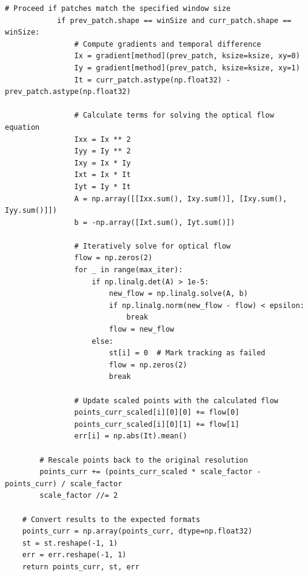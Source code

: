 \documentclass[11pt, conference, letterpaper]{IEEEtran}
\begin{document}
\begin{lstlisting}[style=python, caption={\texttt{calcOpticalFlowPyrLK\_NumPy}}, label={lst:calcOpticalFlowPyrLK}]
            # Proceed if patches match the specified window size
            if prev_patch.shape == winSize and curr_patch.shape == winSize:
                # Compute gradients and temporal difference
                Ix = gradient[method](prev_patch, ksize=ksize, xy=0)
                Iy = gradient[method](prev_patch, ksize=ksize, xy=1)
                It = curr_patch.astype(np.float32) - prev_patch.astype(np.float32)

                # Calculate terms for solving the optical flow equation
                Ixx = Ix ** 2
                Iyy = Iy ** 2
                Ixy = Ix * Iy
                Ixt = Ix * It
                Iyt = Iy * It
                A = np.array([[Ixx.sum(), Ixy.sum()], [Ixy.sum(), Iyy.sum()]])
                b = -np.array([Ixt.sum(), Iyt.sum()])

                # Iteratively solve for optical flow
                flow = np.zeros(2)
                for _ in range(max_iter):
                    if np.linalg.det(A) > 1e-5:
                        new_flow = np.linalg.solve(A, b)
                        if np.linalg.norm(new_flow - flow) < epsilon:
                            break
                        flow = new_flow
                    else:
                        st[i] = 0  # Mark tracking as failed
                        flow = np.zeros(2)
                        break

                # Update scaled points with the calculated flow
                points_curr_scaled[i][0][0] += flow[0]
                points_curr_scaled[i][0][1] += flow[1]
                err[i] = np.abs(It).mean()

        # Rescale points back to the original resolution
        points_curr += (points_curr_scaled * scale_factor - points_curr) / scale_factor
        scale_factor //= 2

    # Convert results to the expected formats
    points_curr = np.array(points_curr, dtype=np.float32)
    st = st.reshape(-1, 1)
    err = err.reshape(-1, 1)
    return points_curr, st, err
\end{lstlisting}
\end{document}
